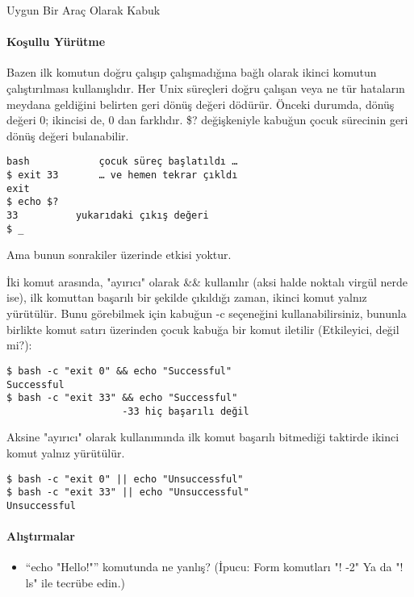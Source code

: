 \begin{section}{Uygun Bir Araç Olarak Kabuk}
\paragraph{Koşullu Yürütme}{Bazen ilk komutun doğru çalışıp çalışmadığına bağlı olarak ikinci komutun çalıştırılması kullanışlıdır. Her Unix süreçleri doğru çalışan veya ne tür hataların meydana geldiğini belirten geri dönüş değeri dödürür. Önceki durumda, dönüş değeri 0; ikincisi de, 0 dan farklıdır. \$? değişkeniyle kabuğun çocuk sürecinin geri dönüş değeri bulanabilir.
\begin{verbatim}
bash 			çocuk süreç başlatıldı …
$ exit 33 		… ve hemen tekrar çıkldı
exit
$ echo $?
33 			yukarıdaki çıkış değeri
$ _
\end{verbatim}

Ama bunun sonrakiler üzerinde etkisi yoktur.

İki komut arasında, "ayırıcı" olarak \&\& kullanılır (aksi halde noktalı virgül nerde ise), ilk komuttan başarılı bir şekilde çıkıldığı zaman, ikinci komut
yalnız yürütülür. Bunu görebilmek için kabuğun -c seçeneğini kullanabilirsiniz, bununla birlikte komut satırı üzerinden çocuk kabuğa bir komut iletilir (Etkileyici, değil mi?):
\begin{verbatim}
$ bash -c "exit 0" && echo "Successful"
Successful
$ bash -c "exit 33" && echo "Successful"
 					-33 hiç başarılı değil
\end{verbatim}

Aksine "ayırıcı" olarak \textbar \textbar kullanımında ilk komut başarılı bitmediği taktirde ikinci komut yalnız yürütülür. 
\begin{verbatim}
$ bash -c "exit 0" || echo "Unsuccessful"
$ bash -c "exit 33" || echo "Unsuccessful"
Unsuccessful
\end{verbatim} }
\paragraph{Alıştırmalar}{
\begin{itemize}
\item “echo "Hello!"” komutunda ne yanlış? (İpucu: Form komutları "! -2" Ya da "! ls" ile tecrübe edin.)
\end{itemize}
}
\end{section}

